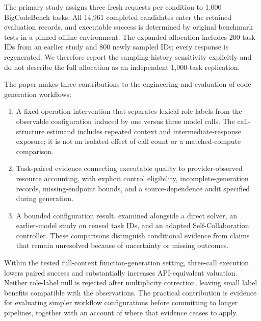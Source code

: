 The primary study assigns three fresh requests per condition to 1,000 BigCodeBench tasks. All 14,961 completed candidates enter the retained evaluation records, and executable success is determined by original benchmark tests in a pinned offline environment. The expanded allocation includes 200 task IDs from an earlier study and 800 newly sampled IDs; every response is regenerated. We therefore report the sampling-history sensitivity explicitly and do not describe the full allocation as an independent 1,000-task replication.

The paper makes three contributions to the engineering and evaluation of code-generation workflows:
\begin{enumerate}
\item A fixed-operation intervention that separates lexical role labels from the observable configuration induced by one versus three model calls. The call-structure estimand includes repeated context and intermediate-response exposure; it is not an isolated effect of call count or a matched-compute comparison.
\item Task-paired evidence connecting executable quality to provider-observed resource accounting, with explicit control eligibility, incomplete-generation records, missing-endpoint bounds, and a source-dependence audit specified during generation.
\item A bounded configuration result, examined alongside a direct solver, an earlier-model study on reused task IDs, and an adapted Self-Collaboration controller. These comparisons distinguish conditional evidence from claims that remain unresolved because of uncertainty or missing outcomes.
\end{enumerate}
Within the tested full-context function-generation setting, three-call execution lowers paired success and substantially increases API-equivalent valuation. Neither role-label null is rejected after multiplicity correction, leaving small label benefits compatible with the observations. The practical contribution is evidence for evaluating simpler workflow configurations before committing to longer pipelines, together with an account of where that evidence ceases to apply.

